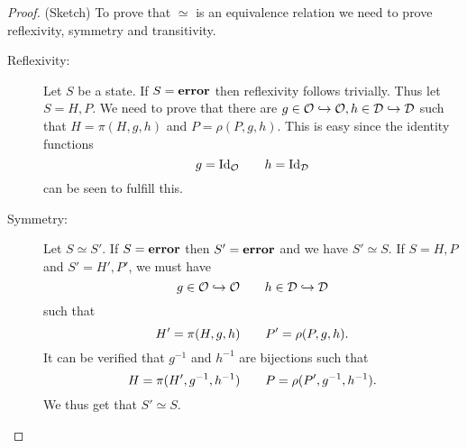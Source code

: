 \begin{proof}{(Sketch)} 
  To prove that $\simeq$ is an equivalence relation we need to prove
  reflexivity, symmetry and transitivity.
  \begin{description}
    \item[Reflexivity:] Let $S$ be a state. If $S = \mbox{{\bf error}}$ then reflexivity
      follows trivially. Thus let $S = H, P$. We need to prove that there are $g
      \in \mathcal{O} \hookrightarrow \mathcal{O}, h \in \mathcal{D} \hookrightarrow \mathcal{D}$ such
      that $H = \pi(H, g, h)$ and $P = \rho(P, g, h)$. This is easy since the
      identity functions
      \begin{equation*}
        g = \mathrm{Id}_{\mathcal{O}} \quad\quad h = \mathrm{Id}_{\mathcal{D}}
      \end{equation*}
      can be seen to fulfill this.

    \item[Symmetry:] Let $S \simeq S'$. If $S = \mbox{{\bf error}}$ then $S' = \mbox{{\bf error}}$ and
      we have $S' \simeq S$. If $S = H, P$ and $S' = H', P'$, we must have
      \begin{equation*}
        g \in \mathcal{O} \hookrightarrow \mathcal{O} \quad\quad h \in \mathcal{D}
        \hookrightarrow \mathcal{D}
      \end{equation*}
      such that
      \begin{equation*}
        H' = \pi(H, g, h) \quad\quad P' = \rho(P, g, h).
      \end{equation*}
      It can be verified that $g^{-1}$ and $h^{-1}$ are bijections such that
      \begin{equation*}
        H = \pi(H', g^{-1}, h^{-1}) \quad\quad P = \rho(P', g^{-1}, h^{-1}).
      \end{equation*}
      We thus get that $S' \simeq S$.


\end{description}
\end{proof}
